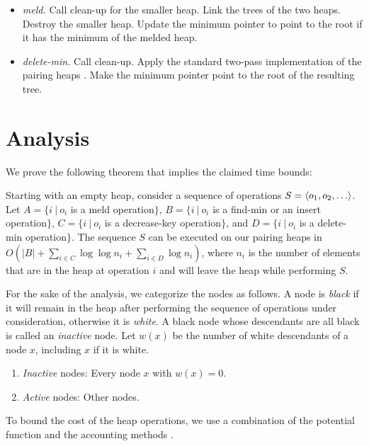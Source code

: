 \begin{itemize}

\item{\it meld.}
Call clean-up for the smaller heap. Link the trees of the two heaps. Destroy the smaller heap. Update the minimum pointer to point to the root if it has the minimum of the melded heap. 

\item{\it delete-min.}
Call clean-up. Apply the standard two-pass implementation of the pairing heaps \cite{fsst}. 
Make the minimum pointer point to the root of the resulting tree.


\end{itemize}




\section{Analysis}

We prove the following theorem that implies the claimed time bounds:

\begin{theorem}
Starting with an empty heap, consider a sequence of operations $S=\left\langle o_1, o_2,\ldots\right\rangle$. Let $A = \{i ~|~ o_i$ is a meld operation$\}$, $B = \{i ~|~ o_i$ is a find-min or an insert operation$\}$, $C = \{i ~|~ o_i$ is a decrease-key operation$\}$, and $D = \{i ~|~ o_i$ is a delete-min operation$\}$. The sequence $S$ can be executed on our pairing heaps in $O(|B| + \sum_{i \in C} \log\log{n_i} + \sum_{i \in D} \log{n_i})$, where $n_i$ is the number of elements that are in the heap at operation $i$ and will leave the heap while performing $S$. 
\end{theorem}

For the sake of the analysis, we categorize the nodes as follows. A node is {\it black} if it will remain in the heap after performing the sequence of operations under consideration, otherwise it is {\it white}. A black node whose descendants are all black is called an {\it inactive} node.
Let $w(x)$ be the number of white descendants of a node $x$, including $x$ if it is white.

\begin{enumerate} 
\item {\it Inactive} nodes: Every node $x$ with $w(x) = 0$.
\item {\it Active} nodes: Other nodes. 
\end{enumerate}  


To bound the cost of the heap operations, we use a combination of the potential function and the accounting methods \cite{t}.

